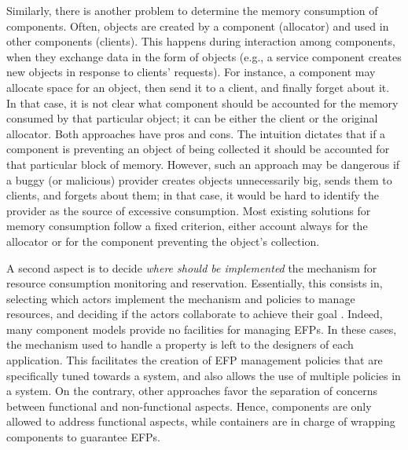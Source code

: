 Similarly, there is another problem to determine the memory consumption of components.
Often, objects are created by a component (allocator) and used in other components (clients).
This happens during interaction among components, when they exchange data in the form of objects (e.g., a service component creates new objects in response to clients' requests).
For instance, a component may allocate space for an object, then send it to a client, and finally forget about it.
In that case, it is not clear what component should be accounted for the memory consumed by that particular object; it can be either the client or the original allocator.
Both approaches have pros and cons.
The intuition dictates that if a component is preventing an object of being collected it should be accounted for that particular block of memory.
However, such an approach may be dangerous if a buggy (or malicious) provider creates objects unnecessarily big, sends them to clients, and forgets about them; in that case, it would be hard to identify the provider as the source of excessive consumption. 
Most existing solutions for memory consumption follow a fixed criterion, either account always for the allocator or for the component preventing the object's collection.

A second aspect is to decide \textit{where should be implemented} the mechanism for resource consumption monitoring and reservation.
Essentially, this consists in, selecting which actors implement the mechanism and policies to manage resources, and deciding if the actors collaborate to achieve their goal \cite{Crnkovic2011}.
Indeed, many component models provide no facilities for managing \glspl{EFP}.
In these cases, the mechanism used to handle a property is left to the designers of each application.
This facilitates the creation of EFP management policies that are specifically tuned towards a system, and also allows the use of multiple policies in a system.
On the contrary, other approaches favor the separation of concerns between functional and non-functional aspects.
Hence, components are only allowed to address functional aspects, while containers are in charge of wrapping components to guarantee EFPs.

